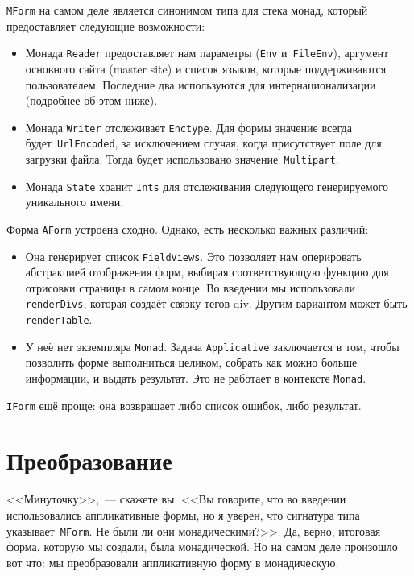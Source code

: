 \lstinline'MForm' на самом деле является синонимом типа для стека монад,
который предоставляет следующие возможности:
\begin{itemize}
    \item Монада \lstinline'Reader' предоставляет нам параметры
        (\lstinline'Env' и~\lstinline'FileEnv'), аргумент основного сайта
        (master site) и список языков, которые поддерживаются пользователем.
        Последние два используются для интернационализации (подробнее об этом
        ниже).

    \item Монада \lstinline'Writer' отслеживает \lstinline'Enctype'. Для формы
        значение всегда будет~\lstinline'UrlEncoded', за исключением случая,
        когда присутствует поле для загрузки файла. Тогда будет использовано
        значение~\lstinline'Multipart'.

    \item Монада \lstinline'State' хранит \lstinline'Ints' для отслеживания
        следующего генерируемого уникального имени.
\end{itemize}

Форма \lstinline'AForm' устроена сходно. Однако, есть несколько важных различий:
\begin{itemize}
    \item Она генерирует список \lstinline'FieldViews'. Это позволяет нам
        оперировать абстракцией отображения форм, выбирая соответствующую
        функцию для отрисовки страницы в самом конце. Во введении мы
        использовали \lstinline'renderDivs', которая создаёт связку тегов div.
        Другим вариантом может быть \lstinline'renderTable'.

    \item У неё нет экземпляра \lstinline'Monad'. Задача
        \lstinline'Applicative' заключается в том, чтобы позволить форме
        выполниться целиком, собрать как можно больше информации, и выдать
        результат. Это не работает в контексте \lstinline'Monad'.
\end{itemize}

\lstinline'IForm' ещё проще: она возвращает либо список ошибок, либо результат.

\section{Преобразование}
<<Минуточку>>,~--- скажете вы. <<Вы говорите, что во введении использовались
аппликативные формы, но я уверен, что сигнатура типа
указывает~\lstinline'MForm'. Не были ли они монадическими?>>. Да, верно,
итоговая форма, которую мы создали, была монадической. Но на самом деле
произошло вот что: мы преобразовали аппликативную форму в монадическую.

